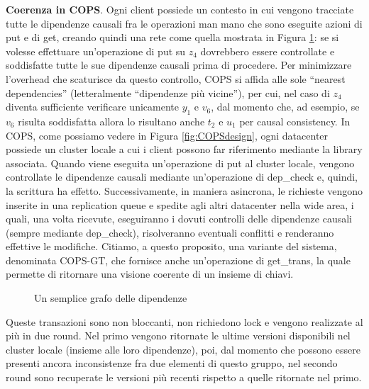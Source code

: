 \documentclass[twoside]{article}
\begin{document}
\begin{multicols}{2}
\textbf{Coerenza in COPS}.
Ogni client possiede un contesto in cui vengono tracciate tutte le dipendenze causali fra le operazioni man mano che sono eseguite azioni di put e di get, creando quindi una rete come quella mostrata in Figura \ref{fig:dipendenze}: se si volesse effettuare un'operazione di put su $z_4$ dovrebbero essere controllate e soddisfatte tutte le sue dipendenze causali prima di procedere. Per minimizzare l'overhead che scaturisce da questo controllo, COPS si affida alle sole ``nearest dependencies'' (letteralmente ``dipendenze più vicine''), per cui, nel caso di $z_4$ diventa sufficiente verificare unicamente $y_1$ e $v_6$, dal momento che, ad esempio, se $v_6$ risulta soddisfatta allora lo risultano anche $t_2$ e $u_1$ per causal consistency.
In COPS, come possiamo vedere in Figura \ref{fig:COPSdesign}, ogni datacenter possiede un cluster locale a cui i client possono far riferimento mediante la library associata.
Quando viene eseguita un'operazione di put al cluster locale, vengono controllate le dipendenze causali mediante un'operazione di dep\_check e, quindi, la scrittura ha effetto. Successivamente, in maniera asincrona, le richieste vengono inserite in una replication queue e spedite agli altri datacenter nella wide area, i quali, una volta ricevute, eseguiranno i dovuti controlli delle dipendenze causali (sempre mediante dep\_check), risolveranno eventuali conflitti e renderanno effettive le modifiche.
Citiamo, a questo proposito, una variante del sistema, denominata COPS-GT, che fornisce anche un'operazione di get\_trans, la quale permette di ritornare una visione coerente di un insieme di chiavi.
\begin{figure}[H]
\centering
{}
\caption{Un semplice grafo delle dipendenze}
\label{fig:dipendenze}
\end{figure}
Queste transazioni sono non bloccanti, non richiedono lock e vengono realizzate al più in due round. 
Nel primo vengono ritornate le ultime versioni disponibili nel cluster locale (insieme alle loro dipendenze), poi, dal momento che possono essere presenti ancora inconsistenze fra due elementi di questo gruppo, nel secondo round sono recuperate le versioni più recenti rispetto a quelle ritornate nel primo.

\end{multicols}
\end{document}
